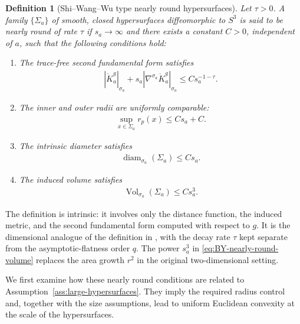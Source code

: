 \documentclass[10pt,a4paper]{amsart}
\newtheorem{definition}[theorem]{Definition}
\begin{document}
	\begin{definition}[Shi--Wang--Wu type nearly round hypersurfaces]
		\label{def:BY-AF-nearly-round}
		Let $\tau>0$. A family $\{\Sigma_a\}$ of smooth, closed
		hypersurfaces diffeomorphic to $S^3$ is said to be nearly round of
		rate $\tau$ if $s_a\to\infty$ and there exists a constant $C>0$,
		independent of $a$, such that the following conditions hold:
		\begin{enumerate}[label=\textup{(\roman*)}]
			\item The trace-free second fundamental form satisfies
			\begin{align}\label{eq:BY-nearly-round-tracefree}
				\left|\mathring K_a^g\right|_{\sigma_a}
				+
				s_a
				\left|
				\nabla^{\sigma_a}\mathring K_a^g
				\right|_{\sigma_a}
				\leq
				Cs_a^{-1-\tau}.
			\end{align}
			
			\item The inner and outer radii are uniformly comparable:
			\begin{align}\label{eq:BY-nearly-round-radius}
				\sup_{x\in\Sigma_a}r_p(x)
				\leq
				Cs_a+C.
			\end{align}
			
			\item The intrinsic diameter satisfies
			\begin{align}\label{eq:BY-nearly-round-diameter}
				\operatorname{diam}_{\sigma_a}(\Sigma_a)
				\leq
				Cs_a.
			\end{align}
			
			\item The induced volume satisfies
			\begin{align}\label{eq:BY-nearly-round-volume}
				\operatorname{Vol}_{\sigma_a}(\Sigma_a)
				\leq
				Cs_a^3.
			\end{align}
		\end{enumerate}
	\end{definition}
	
	The definition is intrinsic: it involves only the distance function,
	the induced metric, and the second fundamental form computed with
	respect to $g$. It is the dimensional analogue of the definition in
	\cite{ShiWangWu}, with the decay rate $\tau$ kept separate from the
	asymptotic-flatness order $q$. The power $s_a^3$ in
	\eqref{eq:BY-nearly-round-volume} replaces the area growth $r^2$ in
	the original two-dimensional setting.
	
	We first examine how these nearly round conditions are related to
	Assumption~\ref{ass:large-hypersurfaces}. They imply the required radius
	control and, together with the size assumptions, lead to uniform
	Euclidean convexity at the scale of the hypersurfaces. 
	
\end{document}
